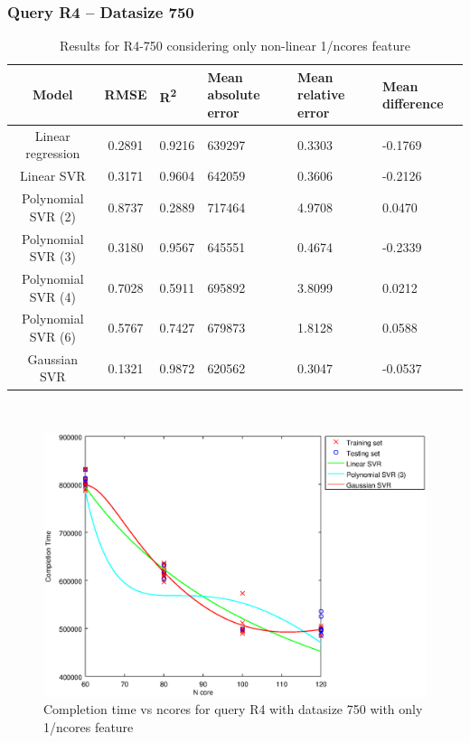 \documentclass[a4paper,11pt]{article}
\begin{document}
\newpage
\subsubsection{Query R4 -- Datasize 750}
\begin{table}[H]
	\centering
	\begin{adjustbox}{center}
		\begin{tabular}{c | c M{1.2cm} M{2.5cm} M{2.5cm} M{1.8cm}}
			Model & RMSE & R\textsuperscript{2} & Mean absolute error & Mean relative error & Mean difference \tabularnewline
			\hline
			Linear regression & 0.2891 & 0.9216 & 639297 & 0.3303 & -0.1769 \\
			Linear SVR & 0.3171 & 0.9604 & 642059 & 0.3606 & -0.2126 \\
			Polynomial SVR (2) & 0.8737 & 0.2889 & 717464 & 4.9708 & 0.0470 \\
			Polynomial SVR (3) & 0.3180 & 0.9567 & 645551 & 0.4674 & -0.2339 \\
			Polynomial SVR (4) & 0.7028 & 0.5911 & 695892 & 3.8099 & 0.0212 \\
			Polynomial SVR (6) & 0.5767 & 0.7427 & 679873 & 1.8128 & 0.0588 \\
			Gaussian SVR & 0.1321 & 0.9872 & 620562 & 0.3047 & -0.0537 \\
		\end{tabular}
	\end{adjustbox}
	\\
	\caption{Results for R4-750 considering only non-linear 1/ncores feature}
	\label{table_R4_prediction_all}
\end{table}

\begin {figure}[hbtp]
\centering
\includegraphics[width=\textwidth]{output/R4_750_ONLY_1_OVER_NCORES/plot_R4_750_bestmodels.eps}
\caption {Completion time vs ncores for query R4 with datasize 750 with only 1/ncores feature}
\end {figure}
\end{document}

